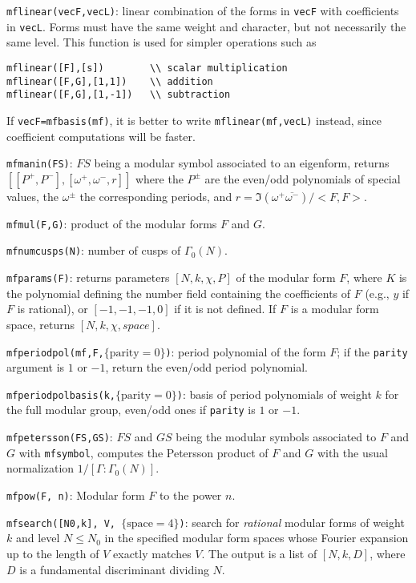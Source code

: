 \documentclass[11pt]{article}
\newcommand{\G}{\Gamma}
\def\kbd#1{{\tt #1}}
\begin{document}
\f\kbd{mflinear(vecF,vecL)}: linear combination of the forms in \kbd{vecF}
with coefficients in \kbd{vecL}. Forms must have the same weight and
character, but not necessarily the same level. This function is used
for simpler operations such as
\begin{verbatim}
mflinear([F],[s])        \\ scalar multiplication
mflinear([F,G],[1,1])    \\ addition
mflinear([F,G],[1,-1])   \\ subtraction
\end{verbatim}
If \kbd{vecF=mfbasis(mf)}, it is better to write \kbd{mflinear(mf,vecL)}
instead, since coefficient computations will be faster.

\f\kbd{mfmanin(FS)}: $FS$ being a modular symbol associated to an eigenform,
returns $[[P^+,P^-],[\omega^+,\omega^-,r]]$ where the $P^{\pm}$ are the
even/odd polynomials of special values, the $\omega^{\pm}$ the
corresponding periods, and $r=\Im(\omega^+\overline{\omega^-})/<F,F>$.

\f\kbd{mfmul(F,G)}: product of the modular forms $F$ and $G$.

\f\kbd{mfnumcusps(N)}: number of cusps of $\G_0(N)$.

\f\kbd{mfparams(F)}: returns parameters $[N,k,\chi,P]$ of the modular form $F$,
where $K$ is the polynomial defining the number field containing the
coefficients of $F$ (e.g., $y$ if $F$ is rational), or $[-1,-1,-1,0]$ if
it is not defined. If $F$ is a modular form space, returns $[N,k,\chi,space]$.

\f\kbd{mfperiodpol(mf,F,$\{\text{parity}=0\}$)}: period polynomial of the
form $F$; if the \kbd{parity} argument is $1$ or $-1$, return the even/odd
period polynomial.

\f\kbd{mfperiodpolbasis(k,$\{\text{parity}=0\}$)}: basis of period polynomials of weight
$k$ for the full modular group, even/odd ones if \kbd{parity} is $1$ or $-1$.

\f\kbd{mfpetersson(FS,GS)}: $FS$ and $GS$ being the modular symbols associated
to $F$ and $G$ with \kbd{mfsymbol}, computes the Petersson product of $F$ and
$G$ with the usual normalization $1/[\G:\G_0(N)]$.

\f\kbd{mfpow(F, n)}: Modular form $F$ to the power $n$.

\f\kbd{mfsearch([N0,k], V, $\{\text{space}=4\}$)}: search for \emph{rational}
modular forms of weight~$k$ and level $N\le N_0$ in the specified modular
form spaces whose Fourier expansion up to the length of $V$ exactly matches
$V$. The output is a list of $[N,k,D]$, where $D$ is a fundamental
discriminant dividing $N$.
\end{document}
